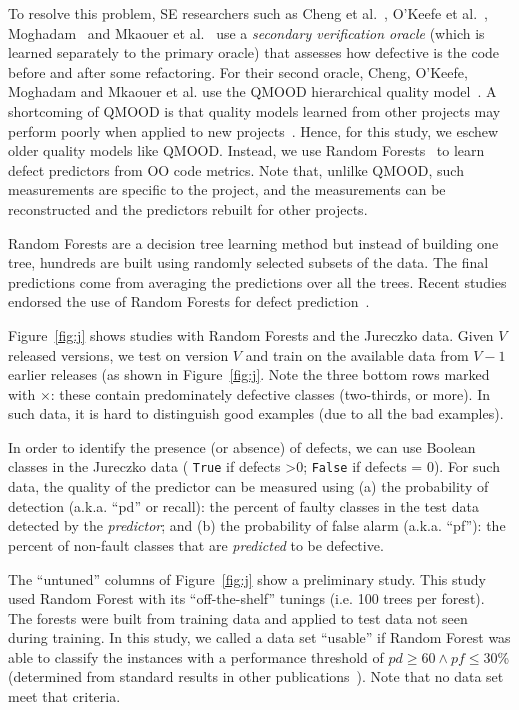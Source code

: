 \documentclass[twocolumn,5p]{elsarticle}
\newcommand{\fig}[1]{Figure~\ref{fig:#1}}
\theoremstyle{break}
\begin{document}
\begin{itemize}
To resolve this  problem, SE researchers such as 
Cheng et al.~\cite{Cheng10}, O'Keefe et al.~\cite{OKeeffe08,OKeeffe07},
Moghadam~\cite{Moghadam2011} and Mkaouer et al.~\cite{Mkaouer14}
use a {\em secondary verification oracle} (which is learned separately
to the primary oracle) that   assesses
how defective is the code before and after some
refactoring. 
For their second oracle,
 Cheng, O'Keefe, Moghadam and  Mkaouer et al. use the QMOOD hierarchical
quality model~\cite{Bansiya02}.
A shortcoming of QMOOD
is that quality models learned from other projects
may perform poorly when applied to new projects~\cite{localvsglobal}.
Hence, for this study, we  eschew
older quality models like QMOOD. Instead, we use
Random Forests~\cite{Breiman2001} to learn defect predictors
from OO code metrics.
Note that, unlilke QMOOD, such measurements 
  are specific to the project, and the measurements can be reconstructed and the predictors rebuilt for other projects.
 
  Random Forests are a decision tree learning method but
  instead of building one tree, hundreds are built using
  randomly selected subsets of the data. The final predictions
  come from averaging the predictions over all the trees.
  Recent studies endorsed the use
  of  Random Forests for  defect prediction~\cite{lessmann}.
  
\fig{j} shows   studies with Random Forests and
the Jureczko data. Given   $V$ released versions, we test on version $V$ and train on the available data from $V-1$ earlier releases (as shown in \fig{j}. Note the   \colorbox{lavenderpink}{three bottom rows}   marked with $\times$: these contain predominately defective classes (two-thirds, or more).  In such data, it is hard to distinguish good examples (due to all the bad examples). 

In order to identify the presence (or absence) of defects, we can   use Boolean classes in the  Jureczko data ( \texttt{True} if defects \textgreater 0; \texttt{False} if defects = 0). For such data, the quality of the predictor can be measured using (a) the  probability of detection (a.k.a. ``pd'' or recall):  the percent of faulty classes in the test data detected by the {\em predictor}; and (b) the  probability of false alarm (a.k.a. ``pf''): the percent of non-fault classes that are {\em predicted} to be defective.

The ``untuned'' columns of \fig{j}
show a preliminary study. This study used
Random Forest with its ``off-the-shelf'' tunings (i.e.  
100 trees per forest).  
The forests were built from training data and applied to test data
not seen during training.  In this
study, we called a data set ``usable'' if   Random Forest was able to classify the instances with a performance threshold of $\mathit{pd}\ge 60 \wedge \mathit{pf} \le 30$\% (determined from standard results in other publications~\cite{me07b}). Note that no  data set meet
that criteria.


\end{itemize}
\end{document}
